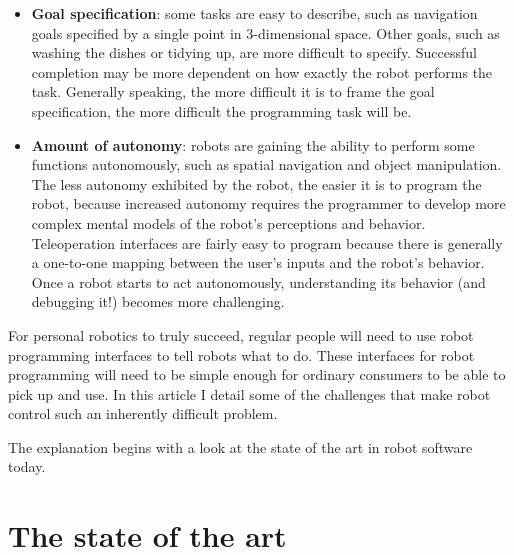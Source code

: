 \documentclass[10pt,twocolumn]{article}
\begin{document}
\begin{changebar}
\begin{itemize}
\item {\bf Goal specification}: some tasks are easy to describe, such as navigation goals specified by a single point in 3-dimensional space. Other goals, such as washing the dishes or tidying up, are more difficult to specify. Successful completion may be more dependent on how exactly the robot performs the task. Generally speaking, the more difficult it is to frame the goal specification, the more difficult the programming task will be.

\item {\bf Amount of autonomy}: robots are gaining the ability to perform some functions autonomously, such as spatial navigation and object manipulation.  The less autonomy exhibited by the robot, the easier it is to program the robot, because increased autonomy requires the programmer to develop more complex mental models of the robot's perceptions and behavior. Teleoperation interfaces are fairly easy to program because there is generally a one-to-one mapping between the user's inputs and the robot's behavior. Once a robot starts to act autonomously, understanding its behavior (and debugging it!) becomes more challenging.
\end{itemize}
\end{changebar}

For personal robotics to truly succeed, regular people will need to use robot programming interfaces to tell robots what to do. These interfaces for robot programming will need to be simple enough for ordinary consumers to be able to pick up and use. In this article I detail some of the challenges that make robot control such an inherently difficult problem.

The explanation begins with a look at the state of the art in robot software today.


\section{The state of the art}

\end{document}
